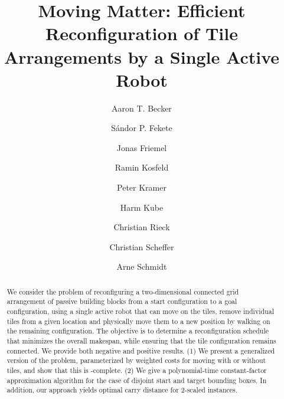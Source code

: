 \documentclass[a4paper,UKenglish,cleveref,thm-restate]{lipics-v2021}
\title{Moving Matter:
Efficient Reconfiguration of Tile Arrangements by a Single Active Robot}
\author{Aaron T. Becker}{Electrical Engineering, University of Houston, Texas, USA}{atbecker@uh.edu}{https://orcid.org/0000-0001-7614-6282}{}
\author{Sándor P. Fekete}{Computer Science, TU Braunschweig, Germany}{s.fekete@tu-bs.de}{https://orcid.org/0000-0002-9062-4241}{}
\author{Jonas Friemel}{Electrical Engineering and Computer Science, Bochum University of Applied Sciences, Germany}{jonas.friemel@hs-bochum.de}{https://orcid.org/0009-0009-6270-4779}{}
\author{Ramin Kosfeld}{Computer Science, TU Braunschweig, Germany}{kosfeld@ibr.cs.tu-bs.de}{https://orcid.org/0000-0002-1081-2454}{}
\author{Peter Kramer}{Computer Science, TU Braunschweig, Germany}{kramer@ibr.cs.tu-bs.de}{https://orcid.org/0000-0001-9635-5890}{}
\author{Harm Kube}{Computer Science, TU Berlin, Germany}{h.kube@campus.tu-berlin.de}{https://orcid.org/0009-0001-5072-7908}{}
\author{Christian Rieck}{Discrete Mathematics, University of Kassel, Germany}{christian.rieck@mathematik.uni-kassel.de}{https://orcid.org/0000-0003-0846-5163}{}
\author{Christian Scheffer}{Electrical Engineering and Computer Science, Bochum University of Applied Sciences, Germany}{christian.scheffer@hs-bochum.de}{https://orcid.org/0000-0002-3471-2706}{}
\author{Arne Schmidt}{Computer Science, TU Braunschweig, Germany}{aschmidt@ibr.cs.tu-bs.de}{https://orcid.org/0000-0001-8950-3963}{}
\begin{document}
    \maketitle

    \begin{abstract}
        We consider the problem of reconfiguring a two-dimensional connected grid arrangement of passive building blocks
        from a start configuration to a goal configuration, using a single active robot that can move on the tiles,
        remove individual tiles from a given location and physically move them to a new
        position by walking on the remaining configuration. The objective is to
        determine a reconfiguration schedule that minimizes the overall
        makespan, while ensuring that the tile configuration remains connected.
        We provide both negative and positive results.
        (1) We present a generalized version of the problem, parameterized by weighted
        costs for moving with or without tiles, and show that this is \NP-complete.
        (2) We give a polynomial-time constant-factor approximation
        algorithm for the case of disjoint start and target bounding boxes. In addition, our approach yields optimal carry distance for 2-scaled instances.
    \end{abstract}

    
    
    
    
    
    
\end{document}
